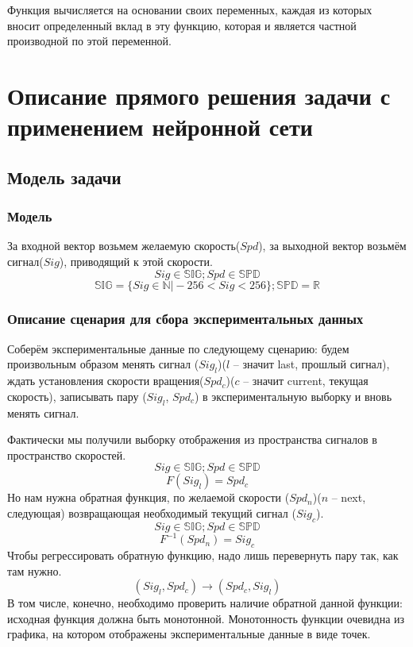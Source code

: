 \documentclass[14pt]{extreport}
\begin{document}
Функция вычисляется на основании своих переменных, каждая из которых вносит определенный вклад в эту функцию, которая и является частной производной по этой переменной.
\newpage
    \chapter{Описание прямого решения задачи с применением нейронной сети}
        \section{Модель задачи}
            \subsection{Модель}
                За входной вектор возьмем желаемую скорость($Spd$), за выходной вектор возьмём сигнал($Sig$), приводящий к этой скорости.
                \[Sig \in \mathbb{SIG}; Spd \in \mathbb{SPD}\]
                \[\mathbb{SIG} = \{Sig \in \mathbb{N}\vert -256 < Sig < 256\}; \mathbb{SPD} = \mathbb{R}\]
            \subsection{Описание сценария для сбора экспериментальных данных}
                Соберём экспериментальные данные по следующему сценарию: будем произвольным образом менять сигнал ($Sig_l$)($l$ -- значит last, прошлый сигнал), ждать установления скорости вращения($Spd_c$)($c$ -- значит current, текущая скорость), записывать пару ($Sig_l$, $Spd_c$) в экспериментальную выборку и вновь менять сигнал.

                Фактически мы получили выборку отображения из пространства сигналов в пространство скоростей.
                \[Sig \in \mathbb{SIG}; Spd \in \mathbb{SPD}\]
                \[F(Sig_l) = Spd_c\]
                Но нам нужна обратная функция, по желаемой скорости ($Spd_n$)($n$ -- next, следующая) возвращающая необходимый текущий сигнал ($Sig_c$).
                \[Sig \in \mathbb{SIG}; Spd \in \mathbb{SPD}\]
                \[F^{-1}(Spd_n) = Sig_c\]
                Чтобы регрессировать обратную функцию, надо лишь перевернуть пару так, как там нужно.
                \[(Sig_l, Spd_c) \rightarrow (Spd_c, Sig_l)\]
                В том числе, конечно, необходимо проверить наличие обратной данной функции: исходная функция должна быть монотонной. Монотонность функции очевидна из графика, на котором отображены экспериментальные данные в виде точек.
\end{document}
